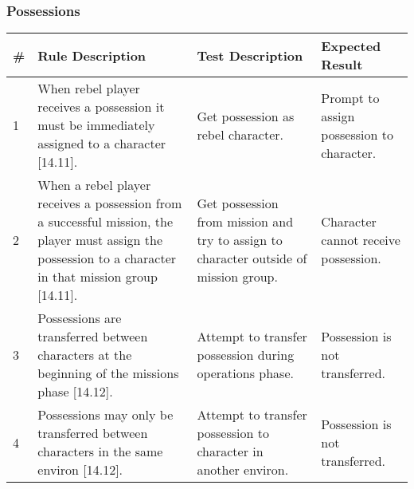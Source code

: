 \subsubsection{Possessions}

\begin{center}

  \begin{longtable}{| p{.5cm} | p{4.5cm} | p{4.5cm} | p{4.5cm} |}
    \hline
    \textbf{\#} &
    \textbf{Rule Description} &
    \textbf{Test Description} &
    \textbf{Expected Result}
    \\ \hline
    
    1 &

    When rebel player receives a possession it must be immediately
    assigned to a character [14.11]. &

    Get possession as rebel character. &
    
    Prompt to assign possession to character. 

    \\ \hline 

    2 &

    When a rebel player receives a possession from a successful
    mission, the player must assign the possession to a character in
    that mission group [14.11]. &

    Get possession from mission and try to assign to character outside
    of mission group. &

    Character cannot receive possession.
    
    \\ \hline

    3 &

    Possessions are transferred between characters at the beginning of
    the missions phase [14.12]. &

    Attempt to transfer possession during operations phase. &

    Possession is not transferred. 

    \\ \hline 

    4 &
    
    Possessions may only be transferred between characters in the same
    environ [14.12]. &

    Attempt to transfer possession to character in another environ. &

    Possession is not transferred. 

    \\ \hline


\end{longtable}
\end{center}
